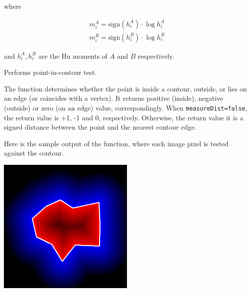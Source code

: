 where

\[
\begin{array}{l}
m^A_i = \mathrm{sign}(h^A_i) \cdot \log{h^A_i} \\
m^B_i = \mathrm{sign}(h^B_i) \cdot \log{h^B_i}
\end{array}
\]

and $h^A_i, h^B_i$ are the Hu moments of $A$ and $B$ respectively.


Performs point-in-contour test.

\begin{description}
\end{description}

The function determines whether the
point is inside a contour, outside, or lies on an edge (or coincides
with a vertex). It returns positive (inside), negative (outside) or zero (on an edge) value,
correspondingly. When \texttt{measureDist=false}, the return value
is +1, -1 and 0, respectively. Otherwise, the return value
it is a signed distance between the point and the nearest contour
edge.

Here is the sample output of the function, where each image pixel is tested against the contour.

\includegraphics[width=0.5\textwidth]{pics/pointpolygon.png}

\fi
